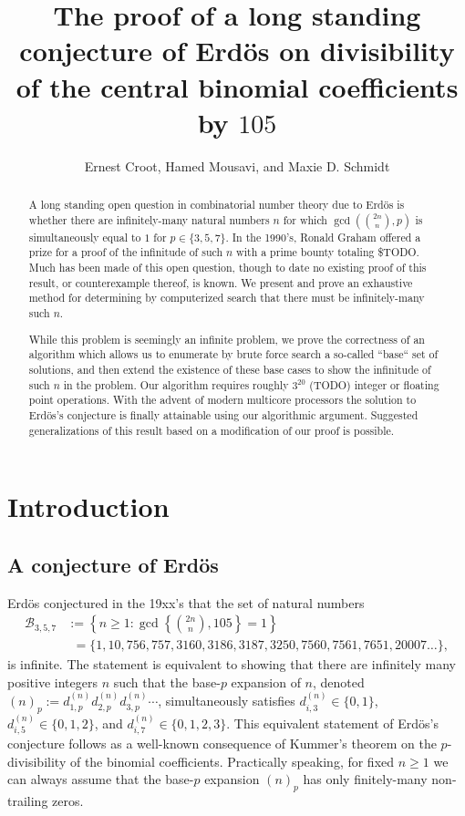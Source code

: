 \documentclass[12pt]{article}
\author{Ernest Croot, Hamed Mousavi, and Maxie D. Schmidt}
\title{The proof of a long standing conjecture of Erd\"os on divisibility of the 
       central binomial coefficients by $105$}
\begin{document}
\maketitle

\begin{abstract} 
A long standing open question in combinatorial number theory due to Erd\"os is whether there are 
infinitely-many natural numbers $n$ for which $\gcd(\binom{2n}{n}, p)$ is simultaneously equal to 
$1$ for $p \in \{3,5,7\}$. In the 1990's, Ronald Graham offered a prize for a proof of the infinitude of such 
$n$ with a prime bounty totaling \$TODO. Much has been made of this open question, though to date 
no existing proof of this result, or counterexample thereof, is known. We present and prove an 
exhaustive method for determining by computerized search that there must be infinitely-many such $n$. 

While this problem is seemingly an infinite problem, we prove the correctness of an algorithm which 
allows us to enumerate by brute force search a so-called ``base`` set of solutions, and then extend the 
existence of these base cases to show the infinitude of such $n$ in the problem. 
Our algorithm requires roughly $3^{20}$ (TODO) integer or floating point operations. 
With the advent of modern multicore processors the solution to Erd\"os's conjecture is finally 
attainable using our algorithmic argument. 
Suggested generalizations of this result based on a modification of our proof is possible. 
\end{abstract} 

\section{Introduction} 

\subsection{A conjecture of Erd\"os} 

Erd\"os conjectured in the 19xx's that the set of natural numbers 
\begin{align*} 
\mathcal{B}_{3,5,7} & := \left\{n \geq 1: \gcd\left\{\binom{2n}{n}, 105\right\} = 1\right\} \\ 
     & \phantom{:}= 
     \{1,10,756,757,3160,3186,3187,3250,7560,7561,7651,20007\ldots\}, 
\end{align*} 
is infinite. The statement is equivalent to showing that there are infinitely many positive integers 
$n$ such that the base-$p$ expansion of $n$, denoted 
$(n)_p := d_{1,p}^{(n)} d_{2,p}^{(n)} d_{3,p}^{(n)}\cdots$, simultaneously satisfies 
$d_{i,3}^{(n)} \in \{0,1\}$, $d_{i,5}^{(n)} \in \{0,1,2\}$, and $d_{i,7}^{(n)} \in \{0,1,2,3\}$. 
This equivalent statement of Erd\"os's conjecture follows as a well-known consequence of Kummer's theorem 
on the $p$-divisibility of the binomial coefficients. 
Practically speaking, for fixed $n \geq 1$ we can always assume that the base-$p$ expansion $(n)_p$ has only 
finitely-many non-trailing zeros. 
\end{document}
